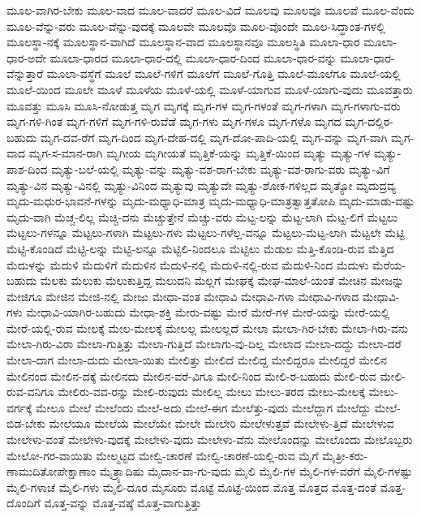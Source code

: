 {ಮೂಲ-ವಾಗಿರ-ಬೇಕು
ಮೂಲ-ವಾದ
ಮೂಲ-ವಾದರೆ
ಮೂಲ-ವಿದೆ
ಮೂಲವು
ಮೂಲವೂ
ಮೂಲವೆ
ಮೂಲ-ವೆಂದು
ಮೂಲ-ವೆನ್ನು-ವರು
ಮೂಲ-ವೆನ್ನು-ವುದಕ್ಕೆ
ಮೂಲವೇ
ಮೂಲವೊ
ಮೂಲ-ವೊಂದೇ
ಮೂಲ-ಸಿದ್ಧಾಂತ-ಗಳಲ್ಲಿ
ಮೂಲಸ್ಥಾ-ನಕ್ಕೆ
ಮೂಲಸ್ಥಾನ-ವಾಗಿದೆ
ಮೂಲಸ್ಥಾನ-ವಾದ
ಮೂಲಸ್ಥಾನವೂ
ಮೂಲಸ್ಥಿತಿ
ಮೂಲಾ-ಧಾರ
ಮೂಲಾ-ಧಾರ-ಅದೇ
ಮೂಲಾ-ಧಾರದ
ಮೂಲಾ-ಧಾರ-ದಲ್ಲಿ
ಮೂಲಾ-ಧಾರ-ದಿಂದ
ಮೂಲಾ-ಧಾರ-ವನ್ನು
ಮೂಲಾ-ಧಾರ-ವೆನ್ನುತ್ತಾರೆ
ಮೂಲಾ-ವಸ್ಥೆಗೆ
ಮೂಲೆ
ಮೂಲೆ-ಗಳಿಗೆ
ಮೂಲೆಗೆ
ಮೂಲೆ-ಗೊತ್ತಿ
ಮೂಲೆ-ಮೂಲೆಗೂ
ಮೂಲೆ-ಯಲ್ಲಿ
ಮೂಲೆ-ಯಿಂದ
ಮೂಲೇ
ಮೂಳೆ
ಮೂಳೆಯ
ಮೂಳೆ-ಯಲ್ಲಿ
ಮೂಳೆ-ಯಾಗುವ
ಮೂಳೆ-ಯಾಗು-ವುದು
ಮೂವತ್ತಾರು
ಮೂವತ್ತು
ಮೂಸಿ
ಮೂಸಿ-ನೋಡುತ್ತ
ಮೃಗ
ಮೃಗಕ್ಕೆ
ಮೃಗ-ಗಳ
ಮೃಗ-ಗಳಂತೆ
ಮೃಗ-ಗಳಾಗಿ
ಮೃಗ-ಗಳಾಗು-ವರು
ಮೃಗ-ಗಳಿ-ಗಿಂತ
ಮೃಗ-ಗಳಿಗೆ
ಮೃಗ-ಗಳಿ-ರುವೆಡೆ
ಮೃಗ-ಗಳು
ಮೃಗ-ಗಳೂ
ಮೃಗ-ಗಳೊ
ಮೃಗದ
ಮೃಗ-ದಲ್ಲಿರ-ಬಹುದು
ಮೃಗ-ದವ-ರೆಗೆ
ಮೃಗ-ದಿಂದ
ಮೃಗ-ದೇಹ-ದಲ್ಲಿ
ಮೃಗ-ದೋ-ಪಾದಿ-ಯಲ್ಲಿ
ಮೃಗ-ವನ್ನು
ಮೃಗ-ವಾಗಿ
ಮೃಗ-ವಾದ
ಮೃಗ-ಸ-ಮಾನ-ರಾಗಿ
ಮೃಗೀಯ
ಮೃಗೀಯತೆ
ಮೃತ್ತಿಕೆ-ಯನ್ನು
ಮೃತ್ತಿಕೆ-ಯಿಂದ
ಮೃತ್ಯು
ಮೃತ್ಯು-ಗಳ
ಮೃತ್ಯು-ಪಾಶ-ದಿಂದ
ಮೃತ್ಯು-ಬಲೆ-ಯಲ್ಲಿ
ಮೃತ್ಯು-ವನ್ನು
ಮೃತ್ಯು-ವಶ-ರಾಗ-ಬೇಕು
ಮೃತ್ಯು-ವಶ-ರಾಗು-ವರು
ಮೃತ್ಯು-ವಿಗೆ
ಮೃತ್ಯು-ವಿನ
ಮೃತ್ಯು-ವಿನಲ್ಲಿ
ಮೃತ್ಯು-ವಿನಿಂದ
ಮೃತ್ಯುವು
ಮೃತ್ಯುವೇ
ಮೃತ್ಯು-ಶೋಕ-ಗಳಿಲ್ಲದ
ಮೃತ್ಯೋ
ಮೃದುದ್ರವ್ಯ
ಮೃದು-ಮಧುರ-ಭಾವನೆ-ಗಳನ್ನು
ಮೃದು-ಮಧ್ಯಾಧಿ-ಮಾತ್ರ
ಮೃದು-ಮಧ್ಯಾಧಿ-ಮಾತ್ರತ್ವಾತ್ತತೋಪಿ
ಮೃದು-ಮಾಡು-ವಷ್ಟು
ಮೃದು-ವಾಗಿ
ಮೆಚ್ಚ-ಲಿಲ್ಲ
ಮೆಚ್ಚಿ-ದನು
ಮೆಚ್ಚುತ್ತೇನೆ
ಮೆಚ್ಚು-ವರು
ಮೆಟ್ಟ-ಲನ್ನು
ಮೆಟ್ಟ-ಲಾಗಿ
ಮೆಟ್ಟ-ಲಿಗೆ
ಮೆಟ್ಟಲು
ಮೆಟ್ಟಲು-ಗಳನ್ನೂ
ಮೆಟ್ಟಲು-ಗಳಾಗಿ
ಮೆಟ್ಟಲು-ಗಳು
ಮೆಟ್ಟಲು-ಗಳೆಲ್ಲ-ವನ್ನೂ
ಮೆಟ್ಟಲು-ಮೆಟ್ಟ-ಲಾಗಿ
ಮೆಟ್ಟಲೇ
ಮೆಟ್ಟಿ
ಮೆಟ್ಟಿ-ಕೊಂಡಿದೆ
ಮೆಟ್ಟಿ-ಲನ್ನು
ಮೆಟ್ಟಿ-ಲನ್ನೂ
ಮೆಟ್ಟಿಲಿ-ನಿಂದಲೂ
ಮೆಟ್ಟಿಲು
ಮೆಡುಲ
ಮೆತ್ತಿ-ಕೊಂಡಿ-ರುವ
ಮೆತ್ತಿದ
ಮೆದುಳನ್ನು
ಮೆದುಳಿ
ಮೆದುಳಿಗೆ
ಮೆದುಳಿನ
ಮೆದುಳಿ-ನಲ್ಲಿ
ಮೆದುಳಿ-ನಲ್ಲಿ-ರುವ
ಮೆದುಳಿ-ನಿಂದ
ಮೆದುಳು
ಮೆರೆಯ-ಬಹುದು
ಮೆಲಕು
ಮೆಲುಕು
ಮೆಲುಕುತ್ತಿದ್ದ
ಮೆಲುದನಿ
ಮೆಲ್ಲಗೆ
ಮೇಘಕ್ಕೆ
ಮೇಘ-ಮಾಲೆ-ಯಂತೆ
ಮೇಚಿನ
ಮೇಜನ್ನು
ಮೇಜಿಗೂ
ಮೇಜಿನ
ಮೇಜಿ-ನಲ್ಲಿ
ಮೇಜು
ಮೇಧಾ-ವಂತ
ಮೇಧಾವಿ
ಮೇಧಾವಿ-ಗಳಾ
ಮೇಧಾವಿ-ಗಳಾದ
ಮೇಧಾವಿ-ಗಳು
ಮೇಧಾವಿ-ಯಾಗಿರ-ಬಹುದು
ಮೇಧಾ-ಶಕ್ತಿ
ಮೇರು-ವಷ್ಟು
ಮೇರೆ
ಮೇರೆ-ಗಳ
ಮೇರೆ-ಯನ್ನು
ಮೇರೆ-ಯಲ್ಲಿ
ಮೇರೆ-ಯಲ್ಲಿ-ರುವ
ಮೇಲಕ್ಕೆ
ಮೇಲ-ಮೇಲಕ್ಕೆ
ಮೇಲಲ್ಲ
ಮೇಲಲ್ಲದೆ
ಮೇಲಾ
ಮೇಲಾ-ಗಿರ-ಬೇಕು
ಮೇಲಾ-ಗಿರು-ವನು
ಮೇಲಾ-ಗಿರು-ವಿರಾ
ಮೇಲಾ-ಗುತ್ತಿತ್ತು
ಮೇಲಾ-ಗುತ್ತಿದೆ
ಮೇಲಾಗು-ವು-ದಿಲ್ಲ
ಮೇಲಾದ
ಮೇಲಾ-ದದ್ದು
ಮೇಲಾ-ದರೆ
ಮೇಲಾ-ದಾಗ
ಮೇಲಾ-ದುದು
ಮೇಲಾ-ಯಿತು
ಮೇಲಿತ್ತು
ಮೇಲಿದೆ
ಮೇಲಿದ್ದ
ಮೇಲಿದ್ದರೂ
ಮೇಲಿದ್ದರೆ
ಮೇಲಿನ
ಮೇಲಿನಂದ
ಮೇಲಿನ-ದಕ್ಕೆ
ಮೇಲಿನದು
ಮೇಲಿನ-ವರೆ-ವಿಗೂ
ಮೇಲಿ-ನಿಂದ
ಮೇಲಿ-ರ-ಬಹುದು
ಮೇಲಿ-ರುವ
ಮೇಲಿ-ರುವ-ವನಿಗೂ
ಮೇಲಿರು-ವವ-ರನ್ನು
ಮೇಲಿ-ರುವುದು
ಮೇಲಿಲ್ಲ
ಮೇಲು
ಮೇಲು-ತರದ
ಮೇಲು-ಮೇಲಕ್ಕೆ
ಮೇಲು-ವರ್ಗಕ್ಕೆ
ಮೇಲೂ
ಮೇಲೆ
ಮೇಲೆಂದು
ಮೇಲೆ-ಅದು
ಮೇಲೆ-ಈಗ
ಮೇಲೆತ್ತು-ವುದು
ಮೇಲೆದ್ದಾಗ
ಮೇಲೆದ್ದು
ಮೇಲೆ-ಬಿಡ-ಬೇಕು
ಮೇಲೆಯೂ
ಮೇಲೆಯೆ
ಮೇಲೆಯೇ
ಮೇಲೇ
ಮೇಲೇರಿ
ಮೇಲೇಳುತ್ತವೆ
ಮೇಲೇಳು-ತ್ತಿದೆ
ಮೇಲೇಳುವ
ಮೇಲೇಳು-ವಂತೆ
ಮೇಲೇಳು-ವುದಕ್ಕೆ
ಮೇಲೇಳು-ವುದು
ಮೇಲೇಳು-ವೆನು
ಮೇಲೊಂದನ್ನು
ಮೇಲೊಂದು
ಮೇಲೊಬ್ಬರು
ಮೇಲೋ-ಗರ-ವಾಯಿತು
ಮೇಲ್ಮಟ್ಟದ
ಮೇಲ್ವಿ-ಚಾರಣೆ
ಮೇಲ್ವಿ-ಚಾರಣೆ-ಯಲ್ಲಿ-ರುವ
ಮೈಗೆ
ಮೈತ್ರೀ-ಕರು-ಣಾಮುದಿತೋಪೇಕ್ಷಾಣಾಂ
ಮೈತ್ರ್ಯಾದಿಷು
ಮೈದಾನ-ವಾ-ಗು-ವುದು
ಮೈಲಿ
ಮೈಲಿ-ಗಳ
ಮೈಲಿ-ಗಳ-ವರೆಗೆ
ಮೈಲಿ-ಗಳಷ್ಟು
ಮೈಲಿ-ಗಳಾಚೆ
ಮೈಲಿ-ಗಳು
ಮೈಲಿ-ದೂರ
ಮೈಸೂರು
ಮೊಟ್ಟೆ
ಮೊಟ್ಟೆ-ಯಿಂದ
ಮೊತ್ತ
ಮೊತ್ತದ
ಮೊತ್ತ-ದಂತೆ
ಮೊತ್ತ-ದೊಂದಿಗೆ
ಮೊತ್ತ-ವನ್ನು
ಮೊತ್ತ-ವಷ್ಠೆ
ಮೊತ್ತ-ವಾಗುತ್ತಿತ್ತು
}
